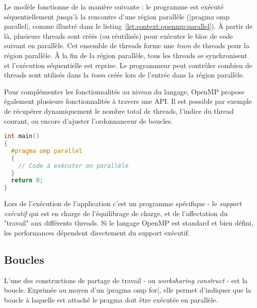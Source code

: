 Le modèle fonctionne de la manière suivante : le programme est exécuté séquentiellement jusqu'à la rencontre d'une région parallèle (|pragma omp parallel|, comme illustré dans le listing~\ref{lst:context:openmp:parallel}).
À partir de là, plusieurs threads sont créés (ou réutilisés) pour exécuter le bloc de code suivant en parallèle.
Cet ensemble de threads forme une \emph{team} de threads pour la région parallèle.
À la fin de la région parallèle, tous les threads se synchronisent et l'exécution séquentielle est reprise.
Le programmeur peut contrôler combien de threads sont utilisés dans la \emph{team} créée lors de l'entrée dans la région parallèle.

Pour complémenter les fonctionnalités au niveau du langage, OpenMP propose également plusieurs fonctionnalités à travers une API.
Il est possible par exemple de récupérer dynamiquement le nombre total de threads, l'indice du thread courant, ou encore d'ajuster l'ordonnanceur de boucles.

\begin{lstlisting}[language=c++,caption=Région parallèle minimale,label=lst:context:openmp:parallel]
int main()
{
  #pragma omp parallel
  {
    // Code à exécuter en parallèle
  }
  return 0;
}
\end{lstlisting}


Lors de l'exécution de l'application c'est un programme spécifique - le \emph{support exécutif} qui est en charge de l'équilibrage de charge, et de l'affectation du "travail" aux différents threads.
Si le langage OpenMP est standard et bien défini, les performances dépendent directement du support exécutif.



\subsection{Boucles}

L'une des constructions de partage de travail - ou \emph{worksharing construct} - est la boucle.
Exprimée au moyen d'un |pragma omp for|, elle permet d'indiquer que la boucle à laquelle est attaché le pragma doit être exécutée en parallèle.

